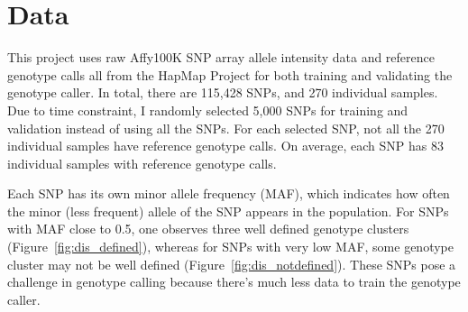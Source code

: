 \documentclass{scrartcl}
\begin{document}
\section{Data}

\par
This project uses raw Affy100K SNP array allele intensity data and reference
genotype calls all from the HapMap Project for both training and validating the
genotype caller.
In total, there are 115,428 SNPs, and 270 individual samples.
Due to time constraint, I randomly selected 5,000 SNPs for training and
validation instead of using all the SNPs.
For each selected SNP, not all the 270 individual samples have reference
genotype calls.
On average, each SNP has 83 individual samples with reference
genotype calls.

\par
Each SNP has its own minor allele frequency (MAF), which indicates how often
the minor (less frequent) allele of the SNP appears in the population.
For SNPs with MAF close to 0.5, one observes three well defined genotype
clusters (Figure~\ref{fig:dis_defined}), whereas for SNPs with very low MAF,
some genotype cluster may not be well defined
(Figure~\ref{fig:dis_notdefined}).
These SNPs pose a challenge in genotype calling because there's much
less data to train the genotype caller.
\end{document}
